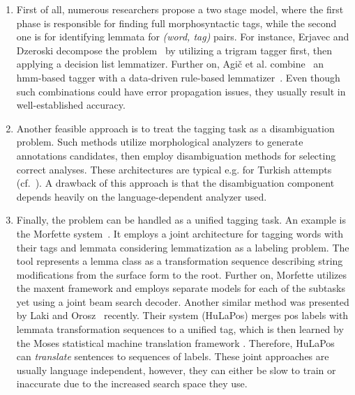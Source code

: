 \begin{enumerate}
  \item First of all, numerous researchers propose a two stage model, where the first phase is responsible for finding full morphosyntactic tags, while the second one is for identifying lemmata for \emph{(word, tag)} pairs. 
  For instance, Erjavec and Dzeroski decompose the problem~\cite{Erjavec2004} by utilizing a trigram  tagger first, then applying a decision list lemmatizer. \label{part:general-lemmatization}
  Further on, Agič et al. combine~\cite{Agic2013} an \acrshort{hmm}-based tagger with a data-driven rule-based lemmatizer~\cite{Jongejan}. 
  Even though such combinations could have error propagation issues, they usually result in well-established accuracy.
  \item Another feasible approach is to treat the tagging task as a disambiguation problem. 
  Such methods utilize morphological analyzers to generate annotations candidates, then employ disambiguation methods for selecting correct analyses.
  These architectures are typical e.g. for Turkish attempts (cf.~\cite{Sak2007,Hakkani-Tur2002}).
  A drawback of this approach is that the disambiguation component depends heavily on the language-dependent analyzer used.
  \item Finally, the problem can be handled as a unified tagging task.
  An example is the Morfette system~\cite{Chrupaa2008}.
  It employs a joint architecture for tagging words with their tags and lemmata considering lemmatization as a labeling problem.
  The tool represents a lemma class as a transformation sequence describing string modifications from the surface form to the root.
  Further on, Morfette utilizes the \acrshort{maxent} framework and employs separate models for each of the subtasks yet using a joint beam search decoder.
  Another similar method was presented by Laki and Orosz~\cite{Laki2013} recently.
  Their system (HuLaPos) merges \gls{pos} labels with lemmata transformation sequences to a unified tag, which is then learned by the Moses statistical machine translation framework \cite{Koehn2007}.
  Therefore, HuLaPos can \emph{translate} sentences to sequences of labels.
  These joint approaches are usually language independent, however, they can either be slow to train or inaccurate due to the increased search space they use.
\end{enumerate}

